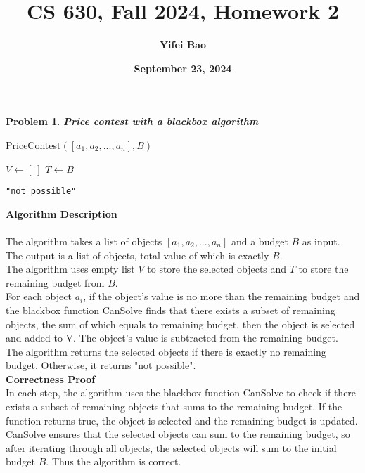 \documentclass[11pt]{exam}
\title{\Large{\textbf{CS 630, Fall 2024, Homework 2}}}
\author{\textbf{Yifei Bao}}
\date{\textbf{September 23, 2024}}
\newtheorem{problem}{Problem}
\let\oldtcc\tcc
\renewcommand{\tcc}[1]{{\color{olive}\oldtcc{#1}}}
\begin{document}
\maketitle

\begin{problem}
    \textbf{Price contest with a blackbox algorithm} 
\end{problem} 

\begin{algorithm}[H]
\caption{PriceContest$([a_1,a_2,...,a_n], B)$}
$V \gets [\ ]$
$T \gets B$

\Return \texttt{"not possible"}\;

\end{algorithm}
\vspace{2em}
\noindent\textbf{Algorithm Description} \\
\\
\indent The algorithm takes a list of objects $[a_1,a_2,...,a_n]$ and a budget $B$ as input. The output is a list of objects, total value of which is exactly $B$.\\
\indent The algorithm uses empty list $V$ to store the selected objects and $T$ to store the remaining budget from $B$.\\
\indent For each object $a_i$, if the object's value is no more than the remaining budget and the blackbox function CanSolve finds that there exists 
a subset of remaining objects, the sum of which equals to remaining budget, then the object is selected and added to V. The object's value is subtracted from the remaining budget.\\
\indent The algorithm returns the selected objects if there is exactly no remaining budget. Otherwise, it returns "not possible".\\

\noindent\textbf{Correctness Proof} \\
\indent In each step, the algorithm uses the blackbox function CanSolve to check if there exists a subset of remaining objects that sums to the remaining budget. If the function returns true, the object is selected and the remaining budget is updated. CanSolve ensures that the selected objects can sum to the remaining budget, so after iterating through all objects, the selected objects will sum to the initial budget $B$. Thus the algorithm is correct.\\
\end{document}
